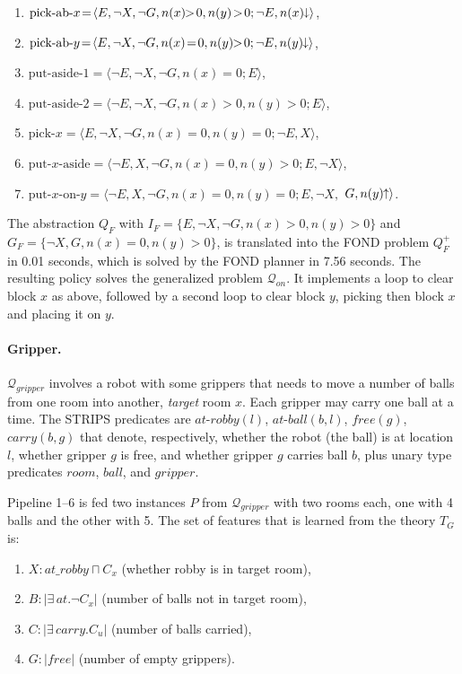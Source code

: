 \documentclass[letterpaper]{article} %
\newcommand{\tup}[1]{\langle #1 \rangle}
\newcommand{\abs}[1]{\ensuremath{\left\vert{#1}\right\vert}}
\newcommand{\Q}{\mathcal{Q}}
\newcommand{\abst}[2]{\tup{#1;#2}}
\newcommand{\pplus}{\hspace{-.05em}\raisebox{.15ex}{\footnotesize$\uparrow$}}
\newcommand{\mminus}{\hspace{-.05em}\raisebox{.15ex}{\footnotesize$\downarrow$}}
\begin{document}
\begin{enumerate}[--]
  \item $\text{pick-ab-$x$}\!=\!\abst{E,\neg X,\neg G,n(x)\!\!>\!0,n(y)\!>\!0}{\neg E,n(x)\mminus}$,
  \item $\text{pick-ab-$y$}\!=\!\abst{E,\neg X,\neg G,n(x)\!=\!0,n(y)\!\!>\!0}{\neg E,n(y)\mminus}$,
  \item $\text{put-aside-1}=\abst{\neg E,\neg X,\neg G,n(x)=0}{E}$,
  \item $\text{put-aside-2}=\abst{\neg E,\neg X,\neg G,n(x)>0,n(y)>0}{E}$,
  \item $\text{pick-$x$}=\abst{E,\neg X,\neg G,n(x)=0,n(y)=0}{\neg E,X}$,
  \item $\text{put-$x$-aside}\!=\!\abst{\neg E,X,\neg G,n(x)=0,n(y)>0}{E,\neg X}$,
  \item $\text{put-$x$-on-$y$} = \langle \neg E, X, \neg G, n(x)=0, n(y)=0; E, \neg X,$ $G, n(y)\pplus \rangle$.
\end{enumerate}

The abstraction $Q_F$  with $I_F\!=\!\{ E, \neg X, \neg G, n(x)\!>\!0, n(y)\!>\!0\}$
and $G_F = \{ \neg X, G, n(x)=0, n(y)\!>\!0\}$, is translated into the FOND problem
$Q_F^+$  in 0.01 seconds, which is solved by the FOND planner  in 7.56 seconds.
The resulting policy solves the generalized problem $\Q_{on}$.
It implements a loop  to clear block $x$ as above,  followed by a second  loop to clear block $y$,
picking then block $x$ and placing it on  $y$. 


\paragraph{Gripper.}
$\Q_{gripper}$ involves  a robot with some grippers
that needs to move a number of balls from one room into another,
\emph{target} room $x$. Each gripper may carry one ball at a time.
The STRIPS predicates are $at\text{-}robby(l)$, $at\text{-}ball(b,l)$,
$free(g)$, $carry(b,g)$ that denote, respectively, whether the robot
(the ball) is at location $l$, whether gripper $g$ is free, and whether
gripper $g$ carries ball $b$, plus unary type predicates $room$, $ball$,
and $gripper$. %

Pipeline 1--6 is fed  two instances $P$ from $\Q_{gripper}$  with two
rooms each, one with 4 balls and the other with 5. The set of features that
is learned  from the theory $T_G$ is:
\begin{enumerate}[--]
  \item $X: at\_robby \sqcap C_x$ (whether robby is in target room),
  \item $B: |\exists\,at . \neg C_x|$ (number of balls not in target room),
  \item $C: |\exists\,carry . C_u|$ (number of balls carried),
  \item $G: \abs{free}$ (number of empty grippers).
\end{enumerate}
\end{document}
